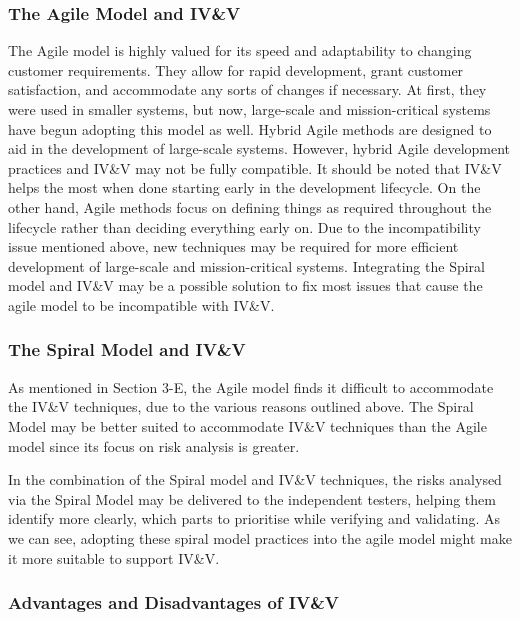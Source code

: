\documentclass[journal, onecolumn]{IEEEtran}
\begin{document}
	
	\subsubsection{The Agile Model and IV\&V}
	
	
	The Agile model is highly valued for its speed and adaptability to changing customer requirements. They allow for rapid development, grant customer satisfaction, and accommodate any sorts of changes if necessary. At first, they were used in smaller systems, but now, large-scale and mission-critical systems have begun adopting this model as well. Hybrid Agile methods are designed to aid in the development of large-scale systems. However, hybrid Agile development practices and IV\&V may not be fully compatible. It should be noted that IV\&V helps the most when done starting early in the development lifecycle. On the other hand, Agile methods focus on defining things as required throughout the lifecycle rather than deciding everything early on.
	\bigskip
	Due to the incompatibility issue mentioned above, new techniques may be required for more efficient development of large-scale and mission-critical systems. Integrating the Spiral model and IV\&V may be a possible solution to fix most issues that cause the agile model to be incompatible with IV\&V.
	\bigskip
	
	\subsubsection{The Spiral Model and IV\&V}
	As mentioned in Section 3-E, the Agile model finds it difficult to accommodate the IV\&V techniques, due to the various reasons outlined above. The Spiral Model may be better suited to accommodate IV\&V techniques than the Agile model since its focus on risk analysis is greater.
	
	\bigskip
	
	In the combination of the Spiral model and IV\&V techniques, the risks analysed via the Spiral Model may be delivered to the independent testers, helping them identify more clearly, which parts to prioritise while verifying and validating. As we can see, adopting these spiral model practices into the agile model might make it more suitable to support IV\&V.
	
	\bigskip
	
	\subsubsection{Advantages and Disadvantages of IV\&V}
	
\end{document}
